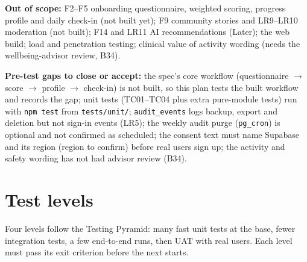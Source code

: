 \documentclass{article}
\begin{document}
\textbf{Out of scope:} F2--F5 onboarding questionnaire, weighted scoring, progress profile and daily check-in (not built yet); F9 community stories and LR9--LR10 moderation (not built); F14 and LR11 AI recommendations (Later); the web build; load and penetration testing; clinical value of activity wording (needs the wellbeing-advisor review, B34).

\textbf{Pre-test gaps to close or accept:} the spec's core workflow (questionnaire $\rightarrow$ score $\rightarrow$ profile $\rightarrow$ check-in) is not built, so this plan tests the built workflow and records the gap; unit tests (TC01--TC04 plus extra pure-module tests) run with \texttt{npm test} from \texttt{tests/unit/}; \texttt{audit\_events} logs backup, export and deletion but not sign-in events (LR5); the weekly audit purge (\texttt{pg\_cron}) is optional and not confirmed as scheduled; the consent text must name Supabase and its region (region to confirm) before real users sign up; the activity and safety wording has not had advisor review (B34).

\section{Test levels}

Four levels follow the Testing Pyramid: many fast unit tests at the base, fewer integration tests, a few end-to-end runs, then UAT with real users. Each level must pass its exit criterion before the next starts.
\end{document}
